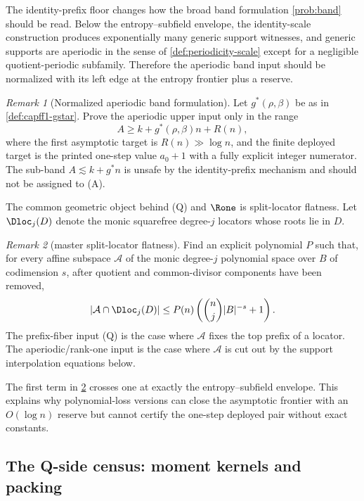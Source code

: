 \documentclass[11pt]{article}
\theoremstyle{definition}
\theoremstyle{remark}
\newtheorem{remark}[remark]{Remark}
\newcommand{\B}{B}
\begin{document}
The identity-prefix floor changes how the broad band formulation \cref{prob:band} should be read.  Below the entropy--subfield envelope, the identity-scale construction produces exponentially many generic support witnesses, and generic supports are aperiodic in the sense of \cref{def:periodicity-scale} except for a negligible quotient-periodic subfamily.  Therefore the aperiodic band input should be normalized with its left edge at the entropy frontier plus a reserve.

\begin{remark}[Normalized aperiodic band formulation]\label{prob:capfr1-normalized-band}
Let \(g^*(\rho,\beta)\) be as in \cref{def:capff1-gstar}.  Prove the aperiodic upper input only in the range
\[
        A\ge k+g^*(\rho,\beta)n+R(n),
\]
where the first asymptotic target is \(R(n)\gg\log n\), and the finite deployed target is the printed one-step value \(a_0+1\) with a fully explicit integer numerator.  The sub-band \(A\lesssim k+g^*n\) is unsafe by the identity-prefix mechanism and should not be assigned to \textup{(A)}.
\end{remark}

The common geometric object behind \textup{(Q)} and \(\Rone\) is split-locator flatness.  Let \(\Dloc_j(D)\) denote the monic squarefree degree-\(j\) locators whose roots lie in \(D\).

\begin{remark}[master split-locator flatness]\label{prob:capfr1-master-flatness}
Find an explicit polynomial \(P\) such that, for every affine subspace \(\mathcal A\) of the monic degree-\(j\) polynomial space over \(\B\) of codimension \(s\), after quotient and common-divisor components have been removed,
\[
        |\mathcal A\cap\Dloc_j(D)|
        \le
        P(n)\left(\binom n j |\B|^{-s}+1\right).
\]
The prefix-fiber input \textup{(Q)} is the case where \(\mathcal A\) fixes the top prefix of a locator.  The aperiodic/rank-one input is the case where \(\mathcal A\) is cut out by the support interpolation equations below.
\end{remark}

The first term in \cref{prob:capfr1-master-flatness} crosses one at exactly the entropy--subfield envelope.  This explains why polynomial-loss versions can close the asymptotic frontier with an \(O(\log n)\) reserve but cannot certify the one-step deployed pair without exact constants.

\subsection{The Q-side census: moment kernels and packing}\label{subsec:capfr1-Q-kernel}
\end{document}

